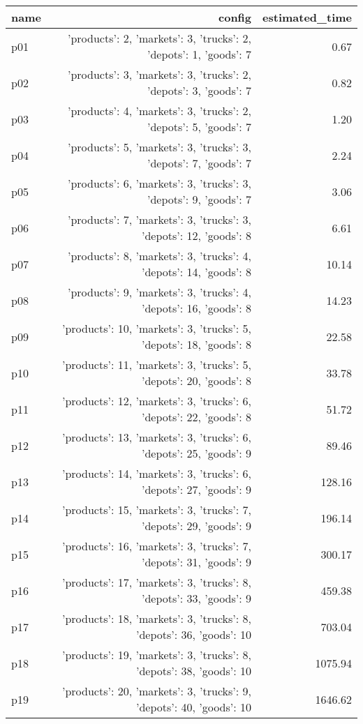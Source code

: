 \documentclass{article}
\begin{document}
                            \begin{center}
                            \scriptsize
                            \begin{tabular}{@{}l|r|r@{}}
                            name & config & estimated\_time\\\midrule
                              p01&{'products': 2, 'markets': 3, 'trucks': 2, 'depots': 1, 'goods': 7}&0.67\\
  p02&{'products': 3, 'markets': 3, 'trucks': 2, 'depots': 3, 'goods': 7}&0.82\\
  p03&{'products': 4, 'markets': 3, 'trucks': 2, 'depots': 5, 'goods': 7}&1.20\\
  p04&{'products': 5, 'markets': 3, 'trucks': 3, 'depots': 7, 'goods': 7}&2.24\\
  p05&{'products': 6, 'markets': 3, 'trucks': 3, 'depots': 9, 'goods': 7}&3.06\\
  p06&{'products': 7, 'markets': 3, 'trucks': 3, 'depots': 12, 'goods': 8}&6.61\\
  p07&{'products': 8, 'markets': 3, 'trucks': 4, 'depots': 14, 'goods': 8}&10.14\\
  p08&{'products': 9, 'markets': 3, 'trucks': 4, 'depots': 16, 'goods': 8}&14.23\\
  p09&{'products': 10, 'markets': 3, 'trucks': 5, 'depots': 18, 'goods': 8}&22.58\\
  p10&{'products': 11, 'markets': 3, 'trucks': 5, 'depots': 20, 'goods': 8}&33.78\\
  p11&{'products': 12, 'markets': 3, 'trucks': 6, 'depots': 22, 'goods': 8}&51.72\\
  p12&{'products': 13, 'markets': 3, 'trucks': 6, 'depots': 25, 'goods': 9}&89.46\\
  p13&{'products': 14, 'markets': 3, 'trucks': 6, 'depots': 27, 'goods': 9}&128.16\\
  p14&{'products': 15, 'markets': 3, 'trucks': 7, 'depots': 29, 'goods': 9}&196.14\\
  p15&{'products': 16, 'markets': 3, 'trucks': 7, 'depots': 31, 'goods': 9}&300.17\\
  p16&{'products': 17, 'markets': 3, 'trucks': 8, 'depots': 33, 'goods': 9}&459.38\\
  p17&{'products': 18, 'markets': 3, 'trucks': 8, 'depots': 36, 'goods': 10}&703.04\\
  p18&{'products': 19, 'markets': 3, 'trucks': 8, 'depots': 38, 'goods': 10}&1075.94\\
  p19&{'products': 20, 'markets': 3, 'trucks': 9, 'depots': 40, 'goods': 10}&1646.62\\

\end{tabular}
\end{center}
\end{document}
